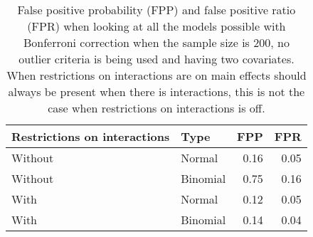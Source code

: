 \begin{longtable}{llrr}
\caption{False positive probability (FPP) and false positive ratio (FPR) when looking at all the models possible with Bonferroni correction when the sample size is 200, no outlier criteria is being used and having two covariates. When restrictions on interactions are on main effects should always be present when there is interactions, this is not the case when restrictions on interactions is off.} \\ 
  \hline
Restrictions on interactions & Type & FPP & FPR \\ 
  \hline
Without & Normal & 0.16 & 0.05 \\ 
  Without & Binomial & 0.75 & 0.16 \\ 
  With & Normal & 0.12 & 0.05 \\ 
  With & Binomial & 0.14 & 0.04 \\ 
   \hline
\hline
\end{longtable}
